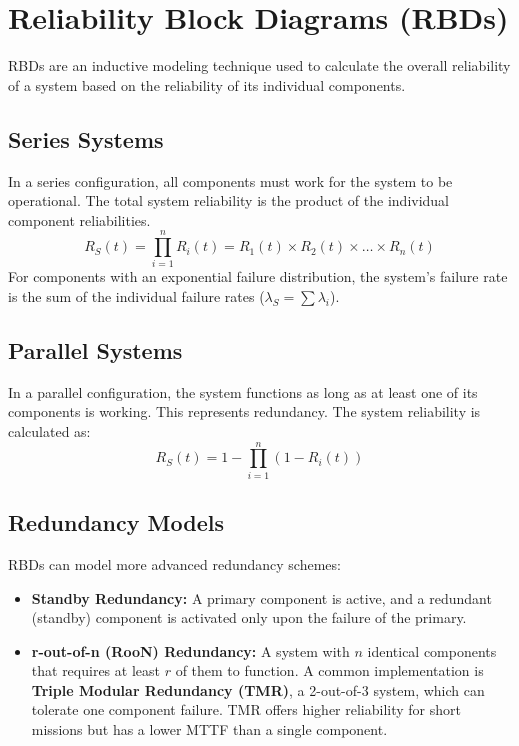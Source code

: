 \section{Reliability Block Diagrams (RBDs)}

RBDs are an inductive modeling technique used to calculate the overall reliability of a system based on the reliability of its individual components.

\subsection{Series Systems}
In a series configuration, all components must work for the system to be operational. The total system reliability is the product of the individual component reliabilities.
\begin{equation}
    R_S(t) = \prod_{i=1}^{n} R_i(t) = R_1(t) \times R_2(t) \times \dots \times R_n(t)
\end{equation}
For components with an exponential failure distribution, the system's failure rate is the sum of the individual failure rates ($\lambda_S = \sum \lambda_i$).

\subsection{Parallel Systems}
In a parallel configuration, the system functions as long as at least one of its components is working. This represents redundancy. The system reliability is calculated as:
\begin{equation}
    R_S(t) = 1 - \prod_{i=1}^{n} (1 - R_i(t))
\end{equation}

\subsection{Redundancy Models}
RBDs can model more advanced redundancy schemes:
\begin{itemize}
    \item \textbf{Standby Redundancy:} A primary component is active, and a redundant (standby) component is activated only upon the failure of the primary.
    \item \textbf{r-out-of-n (RooN) Redundancy:} A system with $n$ identical components that requires at least $r$ of them to function. A common implementation is \textbf{Triple Modular Redundancy (TMR)}, a 2-out-of-3 system, which can tolerate one component failure. TMR offers higher reliability for short missions but has a lower MTTF than a single component.
\end{itemize}